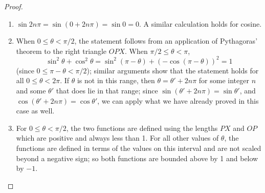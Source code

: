 \documentclass[a4paper,leqno]{article}
\numberwithin{equation}{section}
\theoremstyle{definition}
\theoremstyle{remark}
\begin{document}
\begin{proof}\leavevmode
  \begin{enumerate}
    \item $ \sin 2n\pi = \sin(0 + 2n\pi) = \sin 0 = 0 $. A similar calculation holds for cosine.
    \item When $ 0 \leq \theta < \pi/2 $, the statement follows from an application of Pythagoras' theorem
          to the right triangle $ OPX $. When $ \pi/2 \leq \theta < \pi $,
            \begin{displaymath}
              \sin^2 \theta + \cos^2 \theta = \sin^2(\pi - \theta) + (-\cos (\pi - \theta))^2 = 1
            \end{displaymath}
            (since $ 0 \leq \pi - \theta < \pi/2 $); similar arguments show that the statement holds for all $ 0 \leq \theta < 2\pi $.
            If $ \theta $ is not in this range, then $ \theta = \theta' + 2n\pi $ for some integer $ n $ and some $ \theta' $ that
            does lie in that range; since $ \sin (\theta' + 2n\pi) = \sin \theta' $, and $ \cos (\theta' + 2n\pi) = \cos \theta' $, we
            can apply what we have already proved in this case as well.
    \item For $ 0 \leq \theta < \pi/2 $, the two functions are defined using the lengths $ PX $ and $ OP $ which
          are positive and always less than 1. For all other values of $ \theta $, the functions are defined in
          terms of the values on this interval and are not scaled beyond a negative sign; so both functions are
          bounded above by 1 and below by $ -1 $.


\end{enumerate}
\end{proof}
\end{document}
